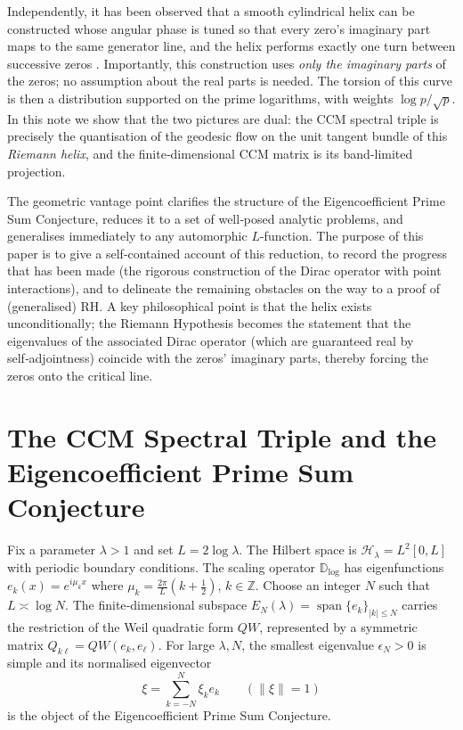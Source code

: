 \documentclass[12pt,a4paper]{article}
\newcommand{\Z}{\mathbb{Z}}
\begin{document}
Independently, it has been observed that a smooth cylindrical helix can be constructed whose angular phase is tuned so that every zero's imaginary part maps to the same generator line, and the helix performs exactly one turn between successive zeros \cite{HelixNote}.  Importantly, this construction uses \emph{only the imaginary parts} of the zeros; no assumption about the real parts is needed.  The torsion of this curve is then a distribution supported on the prime logarithms, with weights $\log p / \sqrt{p}$.  In this note we show that the two pictures are dual: the CCM spectral triple is precisely the quantisation of the geodesic flow on the unit tangent bundle of this \emph{Riemann helix}, and the finite‑dimensional CCM matrix is its band‑limited projection.

The geometric vantage point clarifies the structure of the Eigencoefficient Prime Sum Conjecture, reduces it to a set of well‑posed analytic problems, and generalises immediately to any automorphic $L$-function.  The purpose of this paper is to give a self‑contained account of this reduction, to record the progress that has been made (the rigorous construction of the Dirac operator with point interactions), and to delineate the remaining obstacles on the way to a proof of (generalised) RH.  A key philosophical point is that the helix exists unconditionally; the Riemann Hypothesis becomes the statement that the eigenvalues of the associated Dirac operator (which are guaranteed real by self‑adjointness) coincide with the zeros' imaginary parts, thereby forcing the zeros onto the critical line.

\section{The CCM Spectral Triple and the Eigencoefficient Prime Sum Conjecture}
Fix a parameter $\lambda>1$ and set $L = 2\log\lambda$.  The Hilbert space is $\mathcal{H}_\lambda = L^2[0,L]$ with periodic boundary conditions.  The scaling operator $\mathbb{D}_{\log}$ has eigenfunctions $e_k(x)=e^{i\mu_k x}$ where $\mu_k = \frac{2\pi}{L}(k+\frac12)$, $k\in\Z$.  Choose an integer $N$ such that $L \asymp \log N$.  The finite‑dimensional subspace $E_N(\lambda)=\operatorname{span}\{e_k\}_{|k|\le N}$ carries the restriction of the Weil quadratic form $QW$, represented by a symmetric matrix $Q_{k\ell}=QW(e_k,e_\ell)$.  For large $\lambda,N$, the smallest eigenvalue $\epsilon_N>0$ is simple and its normalised eigenvector
\[
\xi = \sum_{k=-N}^N \xi_k e_k \qquad(\|\xi\|=1)
\]
is the object of the Eigencoefficient Prime Sum Conjecture.
\end{document}

